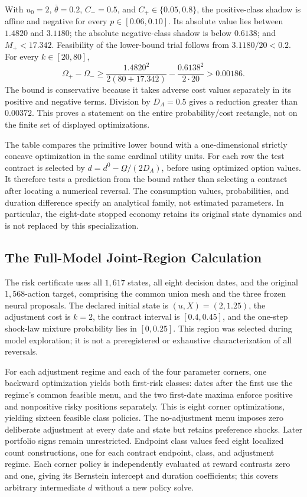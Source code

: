 With $u_0=2$, $\bar\theta=0.2$, $C_-=0.5$, and $C_+\in\{0.05,0.8\}$, the positive-class shadow is affine and negative for every $p\in[0.06,0.10]$. Its absolute value lies between $1.4820$ and $3.1180$; the absolute negative-class shadow is below $0.6138$; and $M_+<17.342$. Feasibility of the lower-bound trial follows from $3.1180/20<0.2$. For every $k\in[20,80]$,
\[
 \Omega_+-\Omega_-
 \geq\frac{1.4820^2}{2(80+17.342)}-\frac{0.6138^2}{2\cdot20}
 >0.00186.
\]
The bound is conservative because it takes adverse cost values separately in its positive and negative terms. Division by $D_A=0.5$ gives a reduction greater than $0.00372$. This proves a statement on the entire probability/cost rectangle, not on the finite set of displayed optimizations.


The table compares the primitive lower bound with a one-dimensional strictly concave optimization in the same cardinal utility units. For each row the test contract is selected by
$d=d^0-\underline\Omega/(2D_A)$, before using optimized option values. It therefore tests a prediction from the bound rather than selecting a contract after locating a numerical reversal. The consumption values, probabilities, and duration difference specify an analytical family, not estimated parameters. In particular, the eight-date stopped economy retains its original state dynamics and is not replaced by this specialization.

\subsection{The Full-Model Joint-Region Calculation}
The risk certificate uses all $1,617$ states, all eight decision dates, and the original $1,568$-action target, comprising the common union mesh and the three frozen neural proposals. The declared initial state is $(u,X)=(2,1.25)$, the adjustment cost is $k=2$, the contract interval is $[0.4,0.45]$, and the one-step shock-law mixture probability lies in $[0,0.25]$. This region was selected during model exploration; it is not a preregistered or exhaustive characterization of all reversals.

For each adjustment regime and each of the four parameter corners, one backward optimization yields both first-risk classes: dates after the first use the regime's common feasible menu, and the two first-date maxima enforce positive and nonpositive risky positions separately. This is eight corner optimizations, yielding sixteen feasible class policies. The no-adjustment menu imposes zero deliberate adjustment at every date and state but retains preference shocks. Later portfolio signs remain unrestricted. Endpoint class values feed eight localized count constructions, one for each contract endpoint, class, and adjustment regime. Each corner policy is independently evaluated at reward contrasts zero and one, giving its Bernstein intercept and duration coefficients; this covers arbitrary intermediate $d$ without a new policy solve.


